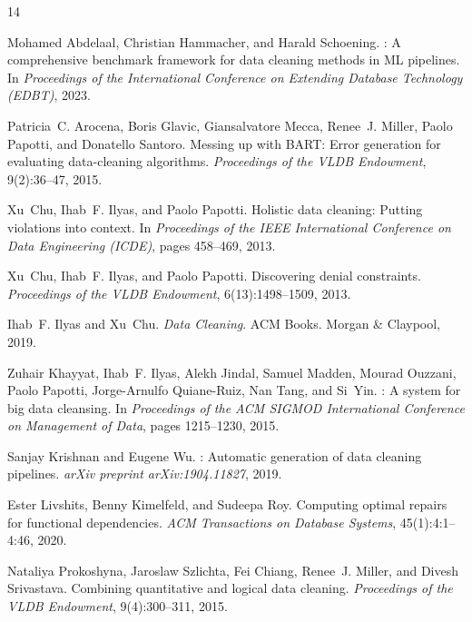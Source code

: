 \documentclass{article}
\begin{document}
\begin{thebibliography}{14}

Mohamed Abdelaal, Christian Hammacher, and Harald Schoening.
: A comprehensive benchmark framework for data cleaning methods in {ML} pipelines.
\newblock In \emph{Proceedings of the International Conference on Extending Database Technology (EDBT)}, 2023.

Patricia~C. Arocena, Boris Glavic, Giansalvatore Mecca, Renee~J. Miller, Paolo Papotti, and Donatello Santoro.
\newblock Messing up with {BART}: Error generation for evaluating data-cleaning algorithms.
\newblock \emph{Proceedings of the VLDB Endowment}, 9(2):36--47, 2015.

Xu~Chu, Ihab~F. Ilyas, and Paolo Papotti.
\newblock Holistic data cleaning: Putting violations into context.
\newblock In \emph{Proceedings of the IEEE International Conference on Data Engineering (ICDE)}, pages 458--469, 2013.

Xu~Chu, Ihab~F. Ilyas, and Paolo Papotti.
\newblock Discovering denial constraints.
\newblock \emph{Proceedings of the VLDB Endowment}, 6(13):1498--1509, 2013.

Ihab~F. Ilyas and Xu~Chu.
\newblock \emph{Data Cleaning}.
\newblock ACM Books. Morgan \& Claypool, 2019.

Zuhair Khayyat, Ihab~F. Ilyas, Alekh Jindal, Samuel Madden, Mourad Ouzzani, Paolo Papotti, Jorge-Arnulfo Quiane-Ruiz, Nan Tang, and Si~Yin.
: A system for big data cleansing.
\newblock In \emph{Proceedings of the ACM SIGMOD International Conference on Management of Data}, pages 1215--1230, 2015.

Sanjay Krishnan and Eugene Wu.
: Automatic generation of data cleaning pipelines.
\newblock \emph{arXiv preprint arXiv:1904.11827}, 2019.

Ester Livshits, Benny Kimelfeld, and Sudeepa Roy.
\newblock Computing optimal repairs for functional dependencies.
\newblock \emph{ACM Transactions on Database Systems}, 45(1):4:1--4:46, 2020.

Nataliya Prokoshyna, Jaroslaw Szlichta, Fei Chiang, Renee~J. Miller, and Divesh Srivastava.
\newblock Combining quantitative and logical data cleaning.
\newblock \emph{Proceedings of the VLDB Endowment}, 9(4):300--311, 2015.


\end{thebibliography}
\end{document}
